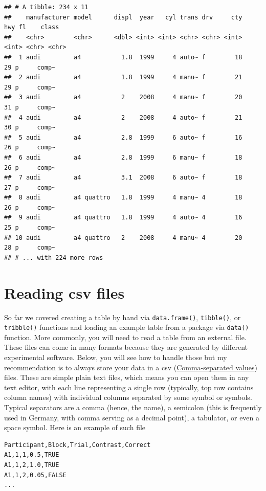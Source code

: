 \documentclass[
]{book}
\begin{document}
\begin{verbatim}
## # A tibble: 234 x 11
##    manufacturer model      displ  year   cyl trans drv     cty   hwy fl    class
##    <chr>        <chr>      <dbl> <int> <int> <chr> <chr> <int> <int> <chr> <chr>
##  1 audi         a4           1.8  1999     4 auto~ f        18    29 p     comp~
##  2 audi         a4           1.8  1999     4 manu~ f        21    29 p     comp~
##  3 audi         a4           2    2008     4 manu~ f        20    31 p     comp~
##  4 audi         a4           2    2008     4 auto~ f        21    30 p     comp~
##  5 audi         a4           2.8  1999     6 auto~ f        16    26 p     comp~
##  6 audi         a4           2.8  1999     6 manu~ f        18    26 p     comp~
##  7 audi         a4           3.1  2008     6 auto~ f        18    27 p     comp~
##  8 audi         a4 quattro   1.8  1999     4 manu~ 4        18    26 p     comp~
##  9 audi         a4 quattro   1.8  1999     4 auto~ 4        16    25 p     comp~
## 10 audi         a4 quattro   2    2008     4 manu~ 4        20    28 p     comp~
## # ... with 224 more rows
\end{verbatim}

\hypertarget{readr}{%
\section{Reading csv files}\label{readr}}

So far we covered creating a table by hand via \texttt{data.frame()}, \texttt{tibble()}, or \texttt{tribble()} functions and loading an example table from a package via \texttt{data()} function. More commonly, you will need to read a table from an external file. These files can come in many formats because they are generated by different experimental software. Below, you will see how to handle those but my recommendation is to always store your data in a csv (\href{https://en.wikipedia.org/wiki/Comma-separated_values}{Comma-separated values}) files. These are simple plain text files, which means you can open them in any text editor, with each line representing a single row (typically, top row contains column names) with individual columns separated by some symbol or symbols. Typical separators are a comma (hence, the name), a semicolon (this is frequently used in Germany, with comma serving as a decimal point), a tabulator, or even a space symbol. Here is an example of such file

\begin{verbatim}
Participant,Block,Trial,Contrast,Correct
A1,1,1,0.5,TRUE
A1,1,2,1.0,TRUE
A1,1,2,0.05,FALSE
...
\end{verbatim}
\end{document}
